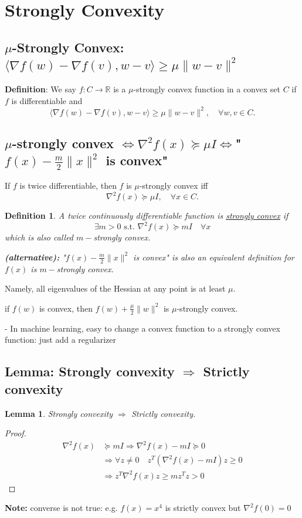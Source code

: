 \documentclass[11pt,a4paper]{article}
\newtheorem{lemma}{Lemma}
\newtheorem{definition}{Definition}
\begin{document}
\section{Strongly Convexity}
\subsection{$\mu$-Strongly Convex: $
\langle\nabla f(w)-\nabla f(v), w-v\rangle \geq \mu\|w-v\|^{2}$}
\textbf{Definition}: We say $f: C \rightarrow \mathbb{R}$ is a $\mu$-strongly convex function in a convex set $C$ if $f$ is differentiable and
$$
\langle\nabla f(w)-\nabla f(v), w-v\rangle \geq \mu\|w-v\|^{2}, \quad \forall w, v \in C .
$$
\subsection{$\mu$-strongly convex $\Leftrightarrow \nabla^{2} f(x) \succeq \mu I\Leftrightarrow$"$f(x)-\frac{m}{2}\|x\|^2$ is convex"}
If $f$ is twice differentiable, then $f$ is $\mu$-strongly convex iff
$$
\nabla^{2} f(x) \succeq \mu I, \quad \forall x \in C .
$$
\begin{definition}
    A twice continuously differentiable function is \underline{strongly convex} if $$\exists m>0\text{ s.t. }\nabla^2 f(x)\succeq mI\quad \forall x$$
    which is also called $m-$strongly convex.

    \textbf{(alternative):} "$f(x)-\frac{m}{2}\|x\|^2$ is convex" is also an equivalent definition for $f(x)$ is $m-$strongly convex.
\end{definition}

Namely, all eigenvalues of the Hessian at any point is at least $\mu$.

if $f(w)$ is convex, then $f(w)+\frac{\mu}{2}\|w\|^{2}$ is $\mu$-strongly convex.

- In machine learning, easy to change a convex function to a strongly convex function: just add a regularizer

\subsection{Lemma: Strongly convexity $\Rightarrow$ Strictly convexity}
\begin{lemma}
    Strongly convexity $\Rightarrow$ Strictly convexity.
\end{lemma}
\begin{proof}
\begin{equation}
    \begin{aligned}
        \nabla^2 f(x)&\succeq mI \Rightarrow \nabla^2 f(x)-mI\succeq 0\\
        & \Rightarrow \forall z\neq 0\quad z^T(\nabla^2 f(x)-mI)z\geq 0\\
        & \Rightarrow z^T\nabla^2 f(x)z\geq mz^Tz>0
    \end{aligned}
    \nonumber
\end{equation}
\end{proof}
\textbf{Note: }converse is not true: e.g. $f(x)=x^4$ is strictly convex but $\nabla^2 f(0)=0$
\end{document}
